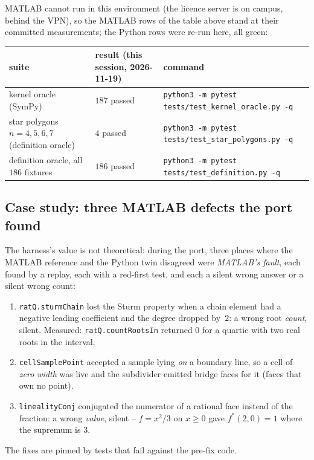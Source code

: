 \documentclass[11pt]{article}
\theoremstyle{definition}
\begin{document}
MATLAB cannot run in this environment (the licence server is on campus, behind
the VPN), so the MATLAB rows of the table above stand at their committed
measurements; the Python rows were re-run here, all green:
\begin{center}
\begin{tabular}{p{4.8cm}p{2.8cm}p{7.4cm}}
\toprule
suite & result (this session, 2026-11-19) & command \\
\midrule
kernel oracle (SymPy) & $187$ passed &
 \texttt{python3 -m pytest tests/test\_kernel\_oracle.py -q} \\
 star polygons $n=4,5,6,7$ (definition oracle) & $4$ passed &
 \texttt{python3 -m pytest tests/test\_star\_polygons.py -q} \\
 definition oracle, all $186$ fixtures & $186$ passed &
 \texttt{python3 -m pytest tests/test\_definition.py -q} \\
\bottomrule
\end{tabular}
\end{center}

\subsection{Case study: three MATLAB defects the port found}

The harness's value is not theoretical: during the port, three places where the
MATLAB reference and the Python twin disagreed were \emph{MATLAB's fault}, each
found by a replay, each with a red-first test, and each a silent wrong answer
or a silent wrong count:
\begin{enumerate}[label=(\arabic*),leftmargin=*]
\item \texttt{ratQ.sturmChain} lost the Sturm property when a chain element
  had a negative leading coefficient and the degree dropped by~$2$: a wrong
  root \emph{count}, silent. Measured: \texttt{ratQ.countRootsIn} returned $0$
  for a quartic with two real roots in the interval.
\item \texttt{cellSamplePoint} accepted a sample lying \emph{on} a boundary
  line, so a cell of \emph{zero width} was live and the subdivider emitted
  bridge faces for it (faces that own no point).
\item \texttt{linealityConj} conjugated the numerator of a rational face
  instead of the fraction: a wrong \emph{value}, silent -- $f=x^2/3$ on
  $x\ge0$ gave $f^*(2,0)=1$ where the supremum is $3$.
\end{enumerate}
The fixes are pinned by tests that fail against the pre-fix code.
\end{document}
